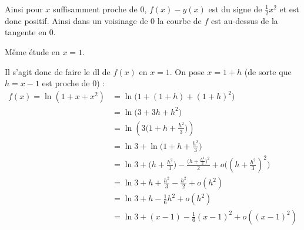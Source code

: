 \documentclass[11pt,a4paper]{article}
\begin{document}
Ainsi pour $x$ suffisamment proche de $0$, $f(x)-y(x)$ est du signe de $\frac12 x^2$
et est donc positif. Ainsi dans un voisinage de $0$ la courbe de $f$ est au-dessus de la tangente
en $0$.

\bigskip

Même étude en $x=1$.

Il s'agit donc de faire le dl de $f(x)$ en $x=1$.
On pose $x=1+h$ (de sorte que $h=x-1$ est proche de $0$) :
\begin{align*}
f(x)=\ln(1+x+x^2) 
  & = \ln \big(1+ (1+h)+(1+h)^2\big)  \\
  & = \ln \big(3 + 3h + h^2 \big)  \\
  & = \ln \left(3 \big(1 + h + \frac{h^2}{3} \big)\right) \\
  & = \ln 3 + \ln \big(1 + h + \frac{h^2}{3} \big) \\
  & = \ln 3 +  \big( h + \frac{h^2}{3} \big) - \frac{\big( h + \frac{h^2}{3} \big)^2}{2} + o\big((h + \frac{h^2}{3})^2 \big) \\ 
  & = \ln 3 + h  + \frac{h^2}{3} -\frac{h^2}{2}  + o(h^2) \\
  & = \ln 3 + h -\frac16 h^2 + o(h^2) \\
  & = \ln 3 + (x-1) - \frac16 (x-1)^2 + o((x-1)^2) \\
\end{align*}
\end{document}
